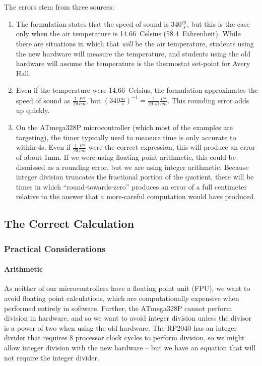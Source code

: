 The errors stem from three sources:
\begin{enumerate}
    \item The formulation states that the speed of sound is $340\frac{m}{s}$, but this is the case only when the air temperature is 14.66\degree~Celsius (58.4\degree~Fahrenheit).
        While there are situations in which that \textit{will} be the air temperature, students using the new hardware will measure the temperature, and students using the old hardware will assume the temperature is the thermostat set-point for Avery Hall.
    \item Even if the temperature were 14.66\degree~Celsius, the formulation approximates the speed of sound as $\frac{1}{29}\frac{\mu s}{cm}$, but $\left(340\frac{m}{s}\right)^{-1} = \frac{1}{29.41}\frac{\mu s}{cm}$.
        This rounding error adds up quickly.
    \item On the ATmega328P microcontroller (which most of the examples are targeting), the timer typically used to measure time is only accurate to within 4\textmu s.
        Even if $\frac{1}{29}\frac{\mu s}{cm}$ were the correct expression, this will produce an error of about 1mm.
        If we were using floating point arithmetic, this could be dismissed as a rounding error, but we are using integer arithmetic.
        Because integer division truncates the fractional portion of the quotient, there will be times in which ``round-towards-zero'' produces an error of a full centimeter relative to the answer that a more-careful computation would have produced.
\end{enumerate}


\subsection{The Correct Calculation}

\subsubsection{Practical Considerations}

\paragraph{Arithmetic}

As neither of our microcontrollers have a floating point unit (FPU), we want to avoid floating point calculations, which are computationally expensive when performed entirely in software.
Further, the ATmega328P cannot perform division in hardware, and so we want to avoid integer division unless the divisor is a power of two when using the old hardware.
The RP2040 has an integer divider that requires 8 processor clock cycles to perform division, so we might allow integer division with the new hardware -- but we have an equation that will not require the integer divider.

